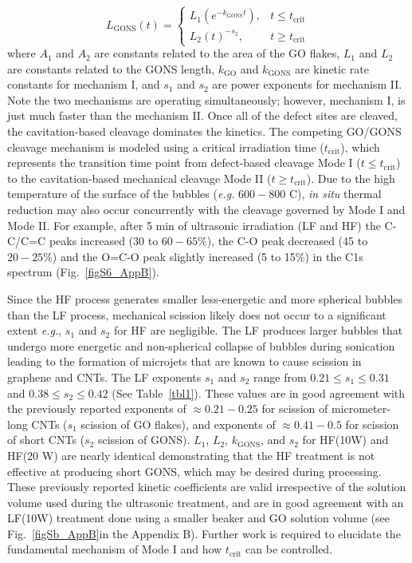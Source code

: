 \begin{equation}
    L_{\mathrm{GONS}}(t) = \begin{cases} L_{1}(e^{-k_{\mathrm{GONS}}t}), & t \leq t_{\mathrm{crit}} \\ L_{2}(t)^{-s_{2}}, & t \geq t_{\mathrm{crit}} \end{cases}
    \label{eqn2}
\end{equation}
where $A_{1}$ and $A_{2}$ are constants related to the area of the GO flakes, $L_{1}$ and $L_{2}$ are constants related to the GONS length, $k_{\mathrm{GO}}$ and $k_{\mathrm{GONS}}$ are kinetic rate constants for mechanism I, and $s_{1}$ and $s_{2}$ are power exponents for mechanism II. Note the two mechanisms are operating simultaneously; however, mechanism I, is just much faster than the mechanism II. Once all of the defect sites are cleaved, the cavitation-based cleavage dominates the kinetics. The competing GO/GONS cleavage mechanism is modeled using a critical irradiation time ($t_{\mathrm{crit}}$), which represents the transition time point from defect-based cleavage Mode I ($t \leq t_{\mathrm{crit}}$) to the cavitation-based mechanical cleavage Mode II ($t \geq t_{\mathrm{crit}}$). Due to the high temperature of the surface of the bubbles (\textit{e.g.} $600 - 800$ \textdegree C), \textit{in situ} thermal reduction may also occur concurrently with the cleavage governed by Mode I and Mode II. For example, after 5 min of ultrasonic irradiation (LF and HF) the C-C/C=C peaks increased (30 to $60-65\%$), the C-O peak decreased (45 to $20-25\%$) and the O=C-O peak slightly increased (5 to 15\%) in the C1s spectrum (Fig.~\ref{figS6_AppB}).

Since the HF process generates smaller less-energetic and more spherical bubbles than the LF process,\cite{Brotchie2009,Merouani2013} mechanical scission likely does not occur to a significant extent \textit{e.g.}, $s_{1}$ and $s_{2}$ for HF are negligible. The LF produces larger bubbles that undergo more energetic and non-spherical collapse of bubbles during sonication leading to the formation of microjets\cite{Xu2013,Han2014} that are known to cause scission in graphene and CNTs.\cite{Khan2010,Hennrich2007,Lucas2009,Pagani2012} The LF exponents $s_{1}$ and $s_{2}$ range from $0.21 \leq s_{1} \leq 0.31$ and $0.38 \leq s_{2} \leq 0.42$ (See Table~\ref{tbl1}). These values are in good agreement with the previously reported exponents of $\approx0.21 - 0.25$ for scission of micrometer-long CNTs ($s_{1}$ scission of GO flakes),\cite{Lucas2009,Pagani2012} and exponents of $\approx0.41 - 0.5$ for scission of short CNTs ($s_{2}$ scission of GONS).\cite{Hennrich2007,Pagani2012} $L_{1}$, $L_{2}$, $k_{\mathrm{GONS}}$, and $s_{2}$ for HF(10W) and HF(20 W) are nearly identical demonstrating that the HF treatment is not effective at producing short GONS, which may be desired during processing. These previously reported kinetic coefficients are valid irrespective of the solution volume used during the ultrasonic treatment, and are in good agreement with an LF(10W) treatment done using a smaller beaker and GO solution volume (see Fig.~\ref{figSb_AppB}in the Appendix B). Further work is required to elucidate the fundamental mechanism of Mode I and how $t_{\mathrm{crit}}$ can be controlled.
